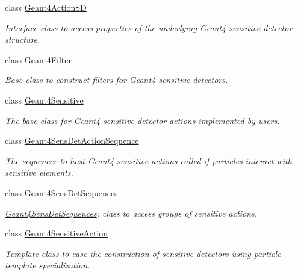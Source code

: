 \begin{DoxyCompactItemize}
class \hyperlink{class_d_d4hep_1_1_simulation_1_1_geant4_action_s_d}{Geant4ActionSD}
\begin{DoxyCompactList}\small\item\em Interface class to access properties of the underlying Geant4 sensitive detector structure. \item\end{DoxyCompactList}\item 
class \hyperlink{class_d_d4hep_1_1_simulation_1_1_geant4_filter}{Geant4Filter}
\begin{DoxyCompactList}\small\item\em Base class to construct filters for Geant4 sensitive detectors. \item\end{DoxyCompactList}\item 
class \hyperlink{class_d_d4hep_1_1_simulation_1_1_geant4_sensitive}{Geant4Sensitive}
\begin{DoxyCompactList}\small\item\em The base class for Geant4 sensitive detector actions implemented by users. \item\end{DoxyCompactList}\item 
class \hyperlink{class_d_d4hep_1_1_simulation_1_1_geant4_sens_det_action_sequence}{Geant4SensDetActionSequence}
\begin{DoxyCompactList}\small\item\em The sequencer to host Geant4 sensitive actions called if particles interact with sensitive elements. \item\end{DoxyCompactList}\item 
class \hyperlink{class_d_d4hep_1_1_simulation_1_1_geant4_sens_det_sequences}{Geant4SensDetSequences}
\begin{DoxyCompactList}\small\item\em \hyperlink{class_d_d4hep_1_1_simulation_1_1_geant4_sens_det_sequences}{Geant4SensDetSequences}: class to access groups of sensitive actions. \item\end{DoxyCompactList}\item 
class \hyperlink{class_d_d4hep_1_1_simulation_1_1_geant4_sensitive_action}{Geant4SensitiveAction}
\begin{DoxyCompactList}\small\item\em Template class to ease the construction of sensitive detectors using particle template specialization. \item\end{DoxyCompactList}\item 

\end{DoxyCompactItemize}
